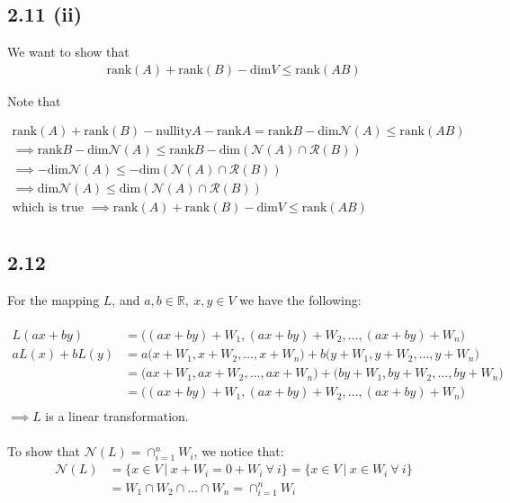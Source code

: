 \documentclass[letterpaper,12pt]{article}
\theoremstyle{definition}
\begin{document}
\subsection*{2.11 (ii)}

We want to show that
\begin{align*}
    \text{rank} (A) + \text{rank} (B) - \text{dim} V \leq \text{rank} (AB)
\end{align*}

Note that

\begin{align*}
    \text{rank} (A) + \text{rank} (B) - \text{nullity} A - \text{rank} A = \text{rank} B - \text{dim} \mathscr{N} (A) \leq \text{rank} (AB) \\
    \implies \text{rank} B - \text{dim} \mathscr{N} (A) \leq \text{rank} B - \text{dim} (\mathscr{N} (A) \cap \mathscr{R} (B))\\
    \implies -\text{dim} \mathscr{N} (A) \leq  - \text{dim} (\mathscr{N} (A) \cap \mathscr{R} (B))\\
    \implies \text{dim} \mathscr{N} (A) \leq   \text{dim} (\mathscr{N} (A) \cap \mathscr{R} (B))\\
    \text{which is true } \implies \text{rank} (A) + \text{rank} (B) - \text{dim} V \leq \text{rank} (AB)\\
\end{align*}

\subsection*{2.12}
For the mapping $L$, and $a,b \in \mathbb{R}, ~ x,y \in V$ we have the following: \\ \\
\begin{align*}
L(ax + by) &= \Big( (ax+by) + W_1, (ax+by) + W_2,\dots, (ax+by) + W_n \Big) \\
aL(x) + bL(y) &= a\Big(x+W_1, x+W_2,\dots, x+W_n \Big) + b\Big(y+W_1, y+W_2,\dots, y+W_n \Big)\\
&= \Big(ax+W_1, ax+W_2,\dots, ax+W_n \Big) + \Big(by+W_1, by+W_2,\dots, by+W_n \Big) \\
&= \Big( (ax+by) + W_1, (ax+by) + W_2,\dots, (ax+by) + W_n \Big) \\
\end{align*}
$\implies L$ is a linear transformation. \\ \\
To show that $\mathscr{N}(L) = \cap_{i=1}^n W_i$, we notice that: 
\begin{align*}
\mathscr{N}(L) &= \{x \in V ~|~ x + W_i = 0 + W_i~ \forall~i\} = \{x \in V ~|~ x \in W_i~\forall~i\} \\
&= W_1 \cap W_2 \cap \dots \cap W_n = \cap_{i=1}^n W_i \\
\end{align*}
\end{document}

